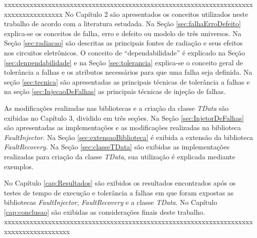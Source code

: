 xxxxxxxxxxxxxxxxxxxxxxxxxxxxxxxxxxxxxxxxxxxxxxxxxxxxxxxxxxxxxxxxxxxxxxxxxxxxxxxxxxxx
No Capítulo 2 são apresentados os conceitos utilizados neste trabalho de acordo com a literatura estudada. Na Seção \ref{sec:falhaErroDefeito} explica-se os conceitos de falha, erro e defeito ou modelo de três universos. Na Seção \ref{sec:radiacao} são descritas as principais fontes de radiação e seus efeitos nos circuitos eletrônicos.  O conceito de ``dependabilidade'' é explicado na Seção \ref{sec:denpendabilidade} e na Seção \ref{sec:tolerancia} explica-se o conceito geral de tolerância a falhas e os atributos necessários para que uma falha seja definida. Na seção \ref{sec:tecnica} são apresentadas as principais técnicas de tolerância a falhas e na seção \ref{sec:InjecaoDeFalhas} as principais técnicas de injeção de falhas.

As modificações realizadas nas bibliotecas e a criação da classe \textit{TData} são exibidas no Capítulo 3, dividido em três seções. Na Seção \ref{sec:InjetorDeFalhas} são apresentadas as implementações e as modificações realizadas na biblioteca \textit{FaultInjector}. Na Seção \ref{sec:extensaoBiblioteca} é exibida a extensão da biblioteca \textit{FaultRecovery}. Na Seção \ref{sec:classeTData} são exibidas as implementações realizadas para criação da classe \textit{TData}, sua utilização é explicada mediante exemplos.

No Capítulo \ref{cap:Resultados} são exibidos os resultados encontrados após os testes de tempo de execução e tolerância a falhas em que foram expostas as bibliotecas \textit{FaultInjector}, \textit{FaultRecovery} e a classe \textit{TData}. No Capítulo \ref{cap:conclusao} são exibidas as considerações finais deste trabalho.
xxxxxxxxxxxxxxxxxxxxxxxxxxxxxxxxxxxxxxxxxxxxxxxxxxxxxxxxxxxxxxxxxxxxxxxxxxxxxxxxxxxxxx

